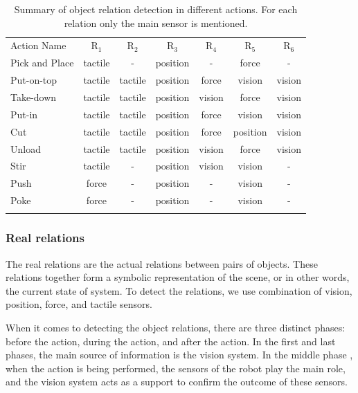 \begin{table}
\centering
\caption{Summary of object relation detection in different actions. For each relation only the main sensor is mentioned.}
\begin{tabular}{ lcccccc }
\hline\noalign{\smallskip}
 Action Name &  $\text{R}_1$ & $\text{R}_2$ &$\text{R}_3$ &$\text{R}_4$ &$\text{R}_5$&$\text{R}_6$ \\
\noalign{\smallskip}\hline\noalign{\smallskip}
 Pick and Place & tactile & -       & position & -     &  force & - \\
 Put-on-top     & tactile & tactile & position & force &  vision & vision \\
 Take-down      & tactile & tactile & position & vision&  force & vision \\
 Put-in         & tactile & tactile & position & force &  vision & vision \\
 Cut            & tactile & tactile & position & force &  position & vision \\
 Unload         & tactile & tactile & position & vision&  force & vision \\
 Stir           & tactile & -       & position & vision&  vision & - \\
 Push           & force   & -       & position & -     &  vision & - \\
 Poke           & force   & -       & position & -     &  vision & - \\
\noalign{\smallskip}\hline
\end{tabular}
\label{tab:relation_detection}
\end{table}



\subsubsection{Real relations}
\label{sec:real_relations}
The real relations are the actual relations between pairs of objects.
These relations together form a symbolic representation of the scene, or in other words, the current state of system.
To detect the relations, we use combination of vision, position, force, and tactile sensors.

When it comes to detecting the object relations, there are three distinct phases: before the action, during the action, and after the action.
In the first and last phases, the main source of information is the vision system.
In the middle phase , when the action is being performed, the sensors of the robot play the main role,
and the vision system acts as a support to confirm the outcome of these sensors.

